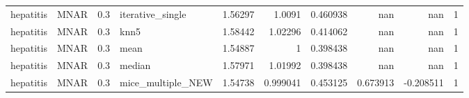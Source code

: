 \begin{table}[ht]
\begin{tabular}{llrlrrrrrr}
 hepatitis       & MNAR        &         0.3 & iterative\_single  &       1.56297  &             1.0091   &              0.460938  &                       nan        &                    nan         &         1 \\
 hepatitis       & MNAR        &         0.3 & knn5              &       1.58442  &             1.02296  &              0.414062  &                       nan        &                    nan         &         1 \\
 hepatitis       & MNAR        &         0.3 & mean              &       1.54887  &             1        &              0.398438  &                       nan        &                    nan         &         1 \\
 hepatitis       & MNAR        &         0.3 & median            &       1.57971  &             1.01992  &              0.398438  &                       nan        &                    nan         &         1 \\
 hepatitis       & MNAR        &         0.3 & mice\_multiple\_NEW &       1.54738  &             0.999041 &              0.453125  &                         0.673913 &                     -0.208511  &         1 \\
\hline
\end{tabular}
\end{table}
